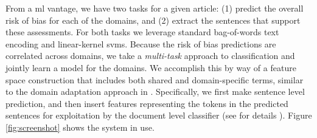 \documentclass[runningheads,a4paper]{llncs}
\begin{document}
From a \ac{ml} vantage, we have two tasks for a given article: (1) predict the overall risk of bias for each of the domains, and (2) extract the sentences that support these assessments.
For both tasks we leverage standard bag-of-words text encoding and linear-kernel \aclp{svm}.
Because the risk of bias predictions are correlated across domains, we take a \emph{multi-task} \cite{Evgeniou2004} approach to classification and jointly learn a model for the domains.
We accomplish this by way of a feature space construction that includes both shared and domain-specific terms, similar to the domain adaptation approach in \cite{Daume2007}.
Specifically, we first make sentence level prediction, and then insert features representing the tokens in the predicted sentences for exploitation by the document level classifier (see for details \cite{Marshall2014}).
Figure \ref{fig:screenshot} shows the system in use.


\end{document}
